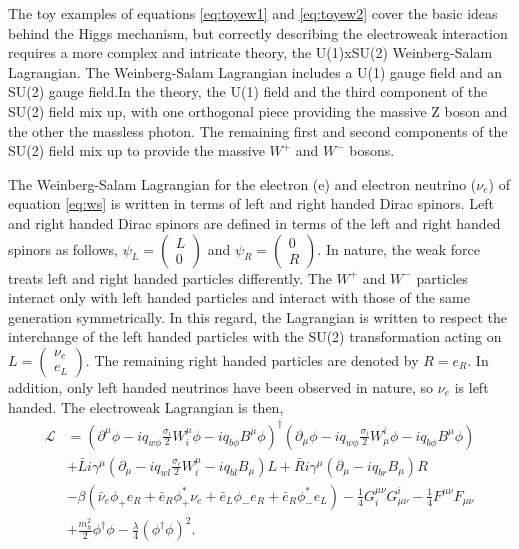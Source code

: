 The toy examples of equations \ref{eq:toyew1} and \ref{eq:toyew2} cover the basic ideas behind the Higgs mechanism, but correctly describing the electroweak interaction requires a more complex and intricate theory, the U(1)xSU(2) Weinberg-Salam Lagrangian. The Weinberg-Salam Lagrangian includes a U(1) gauge field and an SU(2) gauge field.In the theory, the U(1) field and the third component of the SU(2) field mix up, with one orthogonal piece providing the massive Z boson and the other the massless photon. The remaining first and second components of the SU(2) field mix up to provide the massive $W^+$ and $W^-$ bosons. 

The Weinberg-Salam Lagrangian for the electron (e) and electron neutrino ($\nu_e$) of equation \ref{eq:ws} is written in terms of left and right handed Dirac spinors. Left and right handed Dirac spinors are defined in terms of the left and right handed spinors as follows, $\psi_L = \begin{pmatrix} L \\ 0 \end{pmatrix}$ and $\psi_R = \begin{pmatrix} 0 \\ R \end{pmatrix}$. In nature, the weak force treats left and right handed particles differently. The $W^+$ and $W^-$ particles interact only with left handed particles and interact with those of the same generation symmetrically. In this regard, the Lagrangian is written to respect the interchange of the left handed particles with the SU(2) transformation acting on $L = \begin{pmatrix} \nu_e \\ e_L \end{pmatrix}$. The remaining right handed particles are denoted by $R = e_R$. In addition, only left handed neutrinos have been observed in nature, so $\nu_e$ is left handed. The electroweak Lagrangian is then,  
\begin{equation}
\label{eq:ws}
\begin{split}
\mathcal{L} &= (\partial^\mu\phi - iq_{w\phi}\frac{\sigma_i}{2}W_i^\mu\phi - iq_{b\phi}B^\mu\phi)^\dagger
               (\partial_\mu\phi - iq_{w\phi}\frac{\sigma_i}{2}W^i_\mu\phi - iq_{b\phi}B^\mu\phi) \\ 
            &+ \bar{L}i\gamma^\mu(\partial_\mu - iq_{wl}\frac{\sigma_i}{2}W_i^\mu - iq_{bl}B_\mu)L + \bar{R}i\gamma^\mu(\partial_\mu - iq_{br}B_\mu)R \\
            &- \beta(\bar{\nu}_e\phi_+e_R + \bar{e}_R\phi_+^{*}\nu_e + \bar{e}_L\phi_-e_R + \bar{e}_R\phi_-^{*}e_L) 
             - \frac{1}{4}G_i^{\mu\nu}G^i_{\mu\nu} -\frac{1}{4}F^{\mu\nu}F_{\mu\nu} \\
            &+ \frac{m_h^2}{2}\phi^\dagger\phi - \frac{\lambda}{4}(\phi^\dagger\phi)^2.
\end{split}
\end{equation}
